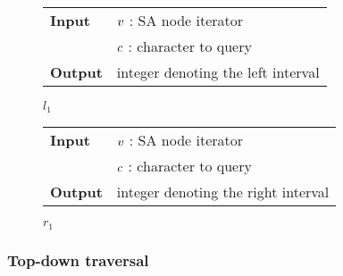 \begin{figure*}[b!]
\begin{minipage}[t]{.5\textwidth}
\begin{algorithm}[H]
\begin{tabular}{ll}
\textbf{Input}  & $v$ : SA node iterator\\
				& $c$ : character to query\\
\textbf{Output} & integer denoting the left interval\\
\end{tabular}
\begin{algorithmic}[1]
	\Else
	\EndIf
\EndWhile
\State \Return $l_1$
\end{algorithmic}
\label{alg:sa-lower}
\end{algorithm}
\end{minipage}
\hfill
\begin{minipage}[t]{.5\textwidth}
\begin{algorithm}[H]
\begin{tabular}{ll}
\textbf{Input}  & $v$ : SA node iterator\\
				& $c$ : character to query\\
\textbf{Output} & integer denoting the right interval\\
\end{tabular}
\begin{algorithmic}[1]
	\Else
	\EndIf
\EndWhile
\State \Return $r_1$
\end{algorithmic}
\label{alg:sa-upper}
\end{algorithm}
\end{minipage}
\end{figure*}

\subsubsection{Top-down traversal}

